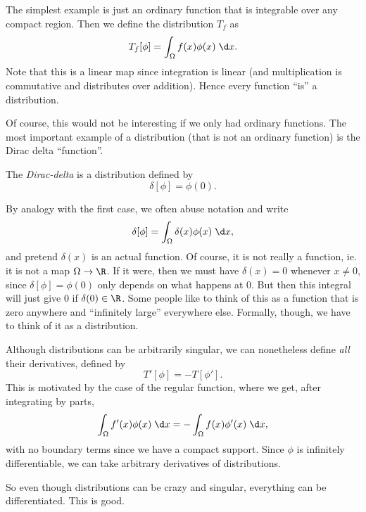 \documentclass[a4paper]{article}
\begin{document}
\begin{eg}
  The simplest example is just an ordinary function that is integrable over any compact region. Then we define the distribution $T_f$ as
  \[
    T_f[\phi] = \int_\Omega f(x) \phi(x) \;\d x.
  \]
  Note that this is a linear map since integration is linear (and multiplication is commutative and distributes over addition). Hence every function ``is'' a distribution.
\end{eg}
Of course, this would not be interesting if we only had ordinary functions. The most important example of a distribution (that is not an ordinary function) is the Dirac delta ``function''.
\begin{defi}
  The \emph{Dirac-delta} is a distribution defined by
  \[
    \delta[\phi] = \phi(0).
  \]
\end{defi}
By analogy with the first case, we often abuse notation and write
\[
  \delta[\phi] = \int_\Omega \delta(x) \phi(x) \;\d x,
\]
and pretend $\delta(x)$ is an actual function. Of course, it is not really a function, ie. it is not a map $\Omega \to \R$. If it were, then we must have $\delta(x) = 0$ whenever $x \not = 0$, since $\delta[\phi] = \phi(0)$ only depends on what happens at $0$. But then this integral will just give $0$ if $\delta(0) \in \R$. Some people like to think of this as a function that is zero anywhere and ``infinitely large'' everywhere else. Formally, though, we have to think of it as a distribution.

Although distributions can be arbitrarily singular, we can nonetheless define \emph{all} their derivatives, defined by
\[
  T'[\phi] = -T[\phi'].
\]
This is motivated by the case of the regular function, where we get, after integrating by parts,
\[
  \int_\Omega f'(x) \phi(x)\;\d x = -\int_\Omega f(x)\phi'(x) \;\d x,
\]
with no boundary terms since we have a compact support. Since $\phi$ is infinitely differentiable, we can take arbitrary derivatives of distributions.

So even though distributions can be crazy and singular, everything can be differentiated. This is good.
\end{document}
